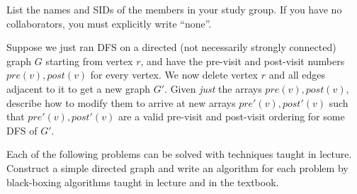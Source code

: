 \documentclass{article}
\begin{document}
List the names and SIDs of the members in your study group.
If you have no collaborators, you must explicitly write “none”.


Suppose we just ran DFS on a directed (not necessarily strongly connected) graph $G$ starting from vertex $r$, and have the pre-visit and post-visit numbers $pre(v), post(v)$ for every vertex. We now delete vertex $r$ and all edges adjacent to it to get a new graph $G'$. Given \emph{just} the arrays $pre(v), post(v)$, describe how to modify them to arrive at new arrays $pre'(v), post'(v)$ such that $pre'(v), post'(v)$ are a valid pre-visit and post-visit ordering for some DFS of $G'$.

Each of the following problems can be solved with techniques taught in lecture. Construct a simple directed graph and write an algorithm for each problem by black-boxing algorithms taught in lecture and in the textbook. 
\end{document}
